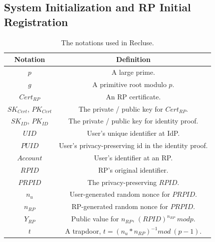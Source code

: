 \subsection{System Initialization and RP Initial Registration}
\begin{table}[tb]
    \caption{The notations used in Recluse.}
    \centering
    \begin{tabular}{|c|c|}
    \hline
    {Notation} & {Definition} \\
    \hline
    {$p$} & {A large prime.} \\
    \hline
    {$g$} & {A primitive root  modulo $p$.} \\
    \hline
    {$Cert_{RP}$} & {An RP certificate.} \\
    \hline
    {$SK_{Cert}$, $PK_{Cert}$} & {The private / public key for $Cert_{RP}$.} \\
    \hline
    {$SK_{ID}$, $PK_{ID}$} & {The private / public key for  identity proof.} \\
    \hline
    {$UID$} & {User's unique identifier at IdP.} \\
    \hline
    {$PUID$} & {User's privacy-preserving id in the identity proof.} \\
    \hline
    {$Account$} & {User's identifier at an RP.} \\
    \hline
    {$RPID$} & {RP's original identifier.} \\
    \hline
    {$PRPID$} & {The privacy-preserving $RPID$.} \\
    \hline
    {$n_u$} & {User-generated random nonce for $PRPID$. } \\
    \hline
    {$n_{RP}$} & {RP-generated random nonce for $PRPID$. } \\
    \hline
    {$Y_{RP}$} & {Public value for $n_{RP}$, $(RPID)^{n_{RP}} \ mod p$. } \\
    \hline
    {$t$} & {A trapdoor, $t=(n_u*n_{RP})^{-1} mod \ (p-1)$. } \\
    \hline
    \end{tabular}
    \label{tbl:notations}
\end{table}

